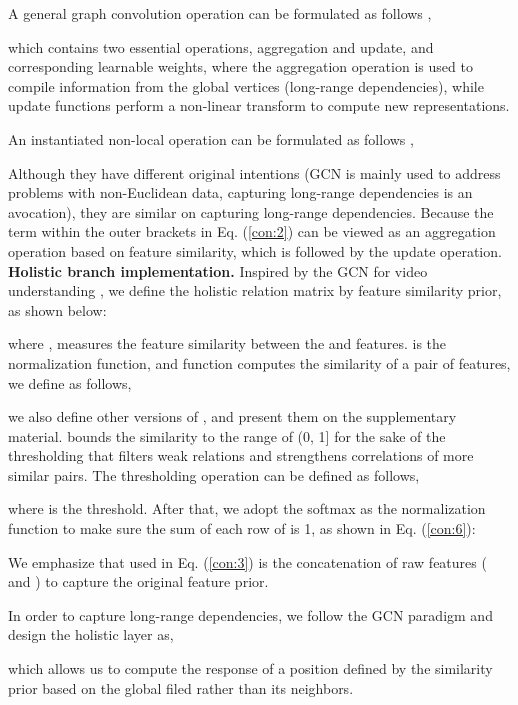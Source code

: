 \documentclass[runningheads]{llncs}
\begin{document}
A general graph convolution operation can be formulated as follows \cite{li2019deepgcns},

which contains two essential operations, aggregation and update, and corresponding learnable weights, where the aggregation operation is used to compile information from the global vertices (long-range dependencies), while update functions perform a non-linear transform to compute new representations.

An instantiated non-local operation can be formulated as follows \cite{wang2018non,yue2018compact},


Although they have different original intentions (GCN is mainly used to address problems with non-Euclidean data, capturing long-range dependencies is an avocation), they are similar on capturing long-range dependencies. Because the term within the outer brackets in Eq. (\ref{con:2}) can be viewed as an aggregation operation based on feature similarity, which is followed by the update operation. \\
\noindent\textbf{Holistic branch implementation.} Inspired by the GCN for video understanding \cite{zhong2019graph,wang2018videos,zeng2019graph}, we define the holistic relation matrix by feature similarity prior, as shown below: 

where ,  measures the feature similarity between the  and  features.  is the normalization function, and function  computes the similarity of a pair of features, we define  as follows,	 

we also define other versions of , and present them on the supplementary material.  bounds the similarity to the range of (0, 1] for the sake of the thresholding that filters weak relations and strengthens correlations of more similar pairs. The thresholding operation can be defined as follows,
	 

where  is the threshold. After that, we adopt the softmax as the normalization function  to make sure the sum of each row of  is 1, as shown in Eq. (\ref{con:6}):
	 


We emphasize that  used in Eq. (\ref{con:3}) is the concatenation of raw features ( and ) to capture the original feature prior.

In order to capture long-range dependencies, we follow the GCN paradigm and design the holistic layer as, 
	 

which allows us to compute the response of a position defined by the similarity prior based on the global filed rather than its neighbors.
\end{document}
